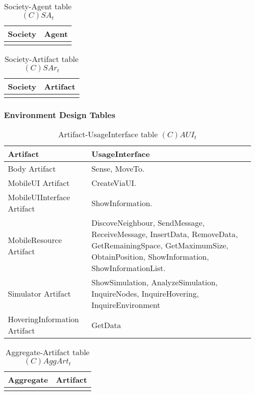 \begin{table}[H]
	\centering
	\begin{tabular}{|p{4cm}|p{8cm}|}
			\hline
			\textbf{Society} & \textbf{Agent} \\
			\hline
			& \\
			\hline
		\end{tabular}
	\caption{Society-Agent table $(C)SA_t$}
	\label{tab:csat}
\end{table}

\begin{table}[H]
	\centering
	\begin{tabular}{|p{4cm}|p{8cm}|}
			\hline
			\textbf{Society} & \textbf{Artifact} \\
			\hline
			& \\
			\hline
		\end{tabular}
	\caption{Society-Artifact table $(C)SAr_t$}
	\label{tab:csart}
\end{table}

\subsubsection{Environment Design Tables}

\begin{table}[H]
	\centering
	\begin{tabular}{|p{4cm}|p{8cm}|}
			\hline
			\textbf{Artifact} & \textbf{UsageInterface} \\
			\hline
			Body Artifact & Sense, MoveTo. \\
			\hline
			MobileUI Artifact & CreateViaUI. \\
			\hline
			MobileUIInterface Artifact & ShowInformation. \\
			\hline
      MobileResource Artifact & DiscoveNeighbour, SendMessage, ReceiveMessage,
      InsertData, RemoveData, GetRemainingSpace, GetMaximumSize,
      ObtainPosition, ShowInformation, ShowInformationList. \\
			\hline
      Simulator Artifact & ShowSimulation, AnalyzeSimulation, InquireNodes,
      InquireHovering, InquireEnvironment \\
			\hline
			HoveringInformation Artifact & GetData \\
			\hline
		\end{tabular}
	\caption{Artifact-UsageInterface table $(C)AUI_t$}
	\label{tab:cauit}
\end{table}

\begin{table}[H]
	\centering
	\begin{tabular}{|p{4cm}|p{8cm}|}
			\hline
			\textbf{Aggregate} & \textbf{Artifact} \\
			\hline
			& \\
			\hline
		\end{tabular}
	\caption{Aggregate-Artifact table $(C)AggArt_t$}
	\label{tab:caggartt}
\end{table}


